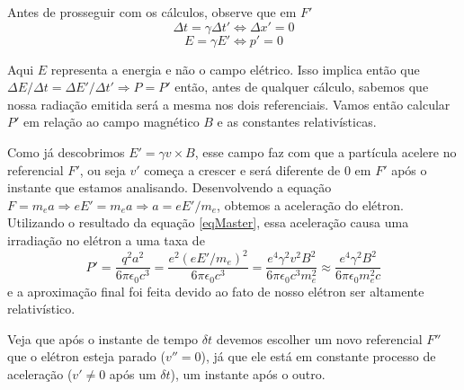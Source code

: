 \documentclass[12pt, letterpaper]{article}
\begin{document}
    Antes de prosseguir com os cálculos, observe que em $F'$
    $$
    \Delta t = \gamma\Delta t' \iff \Delta x' = 0
    $$$$
    E = \gamma E' \iff p' = 0
    $$

    Aqui $E$ representa a energia e não o campo elétrico. Isso implica então que $\Delta E/\Delta t = \Delta E'/\Delta t' \Longrightarrow P = P'$ então, antes de qualquer cálculo, sabemos que nossa radiação emitida será a mesma nos dois referenciais. Vamos então calcular $P'$ em relação ao campo magnético $B$ e as constantes relativísticas.

    Como já descobrimos $E' = \gamma v\times B$, esse campo faz com que a partícula acelere no referencial $F'$, ou seja $v'$ começa a crescer e será diferente de 0 em $F'$ após o instante que estamos analisando. Desenvolvendo a equação $F = m_ea \Rightarrow eE' = m_ea \Rightarrow a = eE'/m_e$, obtemos a aceleração do elétron. Utilizando o resultado da equação \ref{eqMaster}, essa aceleração causa uma irradiação no elétron a uma taxa de
    \begin{equation} \label{eq13}
        P' = \frac{q^2a^2}{6\pi\epsilon_0c^3} = \frac{e^2(eE'/m_e)^2}{6\pi\epsilon_0c^3} = \frac{e^4\gamma^2v^2B^2}{6\pi\epsilon_0c^3m_e^2} \approx \frac{e^4\gamma^2B^2}{6\pi\epsilon_0m_e^2c}
    \end{equation}
    e a aproximação final foi feita devido ao fato de nosso elétron ser altamente relativístico.

    Veja que após o instante de tempo $\delta t$ devemos escolher um novo referencial $F''$ que o elétron esteja parado ($v'' = 0$), já que ele está em constante processo de aceleração ($v' \neq 0$ após um $\delta t$), um instante após o outro.
\end{document}
